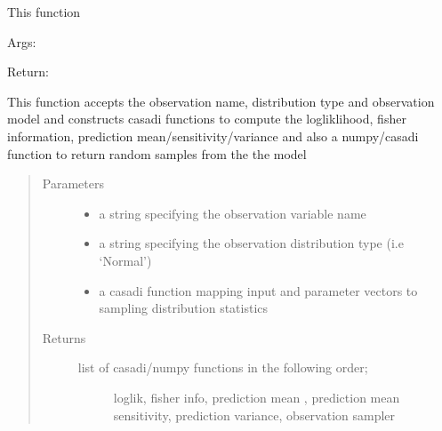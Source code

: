 \documentclass[letterpaper,10pt,english,openany,oneside]{sphinxmanual}
\begin{document}
\begin{fulllineitems}

\begin{fulllineitems}
\label{\detokenize{nloed:nloed.model.Model.evaluate}}
This function

Args:

Return:

\end{fulllineitems}


\begin{fulllineitems}
\label{\detokenize{nloed:nloed.model.Model._get_distribution_functions}}
This function accepts the observation name, distribution type
and observation model and constructs casadi functions to compute
the logliklihood, fisher information, prediction mean/sensitivity/variance
and also a numpy/casadi function to return random samples from the the model
\begin{quote}\begin{description}
\item[{Parameters}] \leavevmode\begin{itemize}
\item {} 
 \textendash{} a string specifying the observation variable name

\item {} 
 \textendash{} a string specifying the observation distribution type (i.e ‘Normal’)

\item {} 
 \textendash{} a casadi function mapping input and parameter vectors to sampling distribution statistics

\end{itemize}

\item[{Returns}] \leavevmode
\begin{description}
\item[{list of casadi/numpy functions in the following order;}] \leavevmode
loglik, fisher info, prediction mean , prediction mean sensitivity,
prediction variance, observation sampler


\end{description}
\end{description}
\end{quote}
\end{fulllineitems}
\end{fulllineitems}
\end{document}

